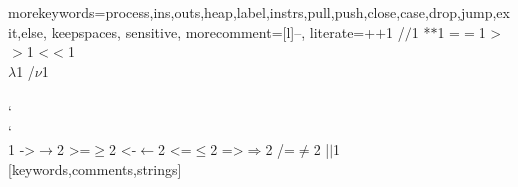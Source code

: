 %
  {morekeywords={process,ins,outs,heap,label,instrs,pull,push,close,case,drop,jump,exit,else},%
   keepspaces,%
   sensitive,%
   morecomment=[l]--,%
   literate={+}{{$+$}}1 {/}{{$/$}}1 {*}{{$*$}}1 {=}{{$=$}}1
            {>}{{$>$}}1 {<}{{$<$}}1 {\\}{{$\lambda$}}1 {/}{{$\nu$}}1
            {\\\\}{{\char`\\\char`\\}}1
            {->}{{$\rightarrow$}}2 {>=}{{$\geq$}}2 {<-}{{$\leftarrow$}}2
            {<=}{{$\leq$}}2 {=>}{{$\Rightarrow$}}2 
            {/=}{{$\ne$}}2
            {|}{{$\mid$}}1
  }[keywords,comments,strings]%






\newcommand\Hs{\lstinline}

\def\lstiproc{\lstinline[language=process]}

